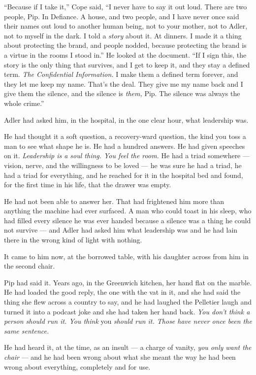\documentclass[11pt,openany]{book}
\newcommand{\scenebreak}{\par\vspace{0.5\baselineskip}\begin{center}\textasteriskcentered\quad\textasteriskcentered\quad\textasteriskcentered\end{center}\vspace{0.5\baselineskip}\par}
\begin{document}
``Because if I take it,'' Cope said, ``I never have to say it out loud. There are two people, Pip. In Defiance. A house, and two people, and I have never once said their names out loud to another human being, not to your mother, not to Adler, not to myself in the dark. I told a \textit{story} about it. At dinners. I made it a thing about protecting the brand, and people nodded, because protecting the brand is a virtue in the rooms I stood in.'' He looked at the document. ``If I sign this, the story is the only thing that survives, and I get to keep it, and they stay a defined term. \textit{The Confidential Information.} I make them a defined term forever, and they let me keep my name. That's the deal. They give me my name back and I give them the silence, and the silence is \textit{them,} Pip. The silence was always the whole crime.''


\scenebreak


Adler had asked him, in the hospital, in the one clear hour, what leadership was.

He had thought it a soft question, a recovery-ward question, the kind you toss a man to see what shape he is. He had a hundred answers. He had given speeches on it. \textit{Leadership is a soul thing. You feel the room.} He had a triad somewhere --- vision, nerve, and the willingness to be loved --- he was sure he had a triad, he had a triad for everything, and he reached for it in the hospital bed and found, for the first time in his life, that the drawer was empty.

He had not been able to answer her. That had frightened him more than anything the machine had ever surfaced. A man who could toast in his sleep, who had filled every silence he was ever handed because a silence was a thing he could not survive --- and Adler had asked him what leadership was and he had lain there in the wrong kind of light with nothing.

It came to him now, at the borrowed table, with his daughter across from him in the second chair.

Pip had said it. Years ago, in the Greenwich kitchen, her hand flat on the marble. He had loaded the good reply, the one with the vat in it, and she had said the thing she flew across a country to say, and he had laughed the Pelletier laugh and turned it into a podcast joke and she had taken her hand back. \textit{You don't think a person should run it. You think} you \textit{should run it. Those have never once been the same sentence.}

He had heard it, at the time, as an insult --- a charge of vanity, \textit{you only want the chair} --- and he had been wrong about what she meant the way he had been wrong about everything, completely and for use.
\end{document}
